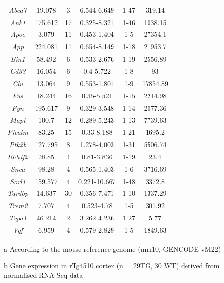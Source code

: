 \begin{table}[]
\begin{threeparttable}
\begin{tabular}{@{}cccccc@{}}
		\textit{Abca7}  & 19.078  & 3  & 6.544-6.649  & 1-47 & 319.14   \\
		\textit{Ank1}   & 175.612 & 17 & 0.325-8.321  & 1-46 & 1038.15  \\
		\textit{Apoe}   & 3.079   & 11 & 0.453-1.404  & 1-5  & 27354.1  \\
		\textit{App}    & 224.081 & 11 & 0.654-8.149  & 1-18 & 21953.7  \\
		\textit{Bin1}   & 58.492  & 6  & 0.533-2.676  & 1-19 & 2556.89  \\
		\textit{Cd33}   & 16.054  & 6  & 0.4-5.722    & 1-8  & 93       \\
		\textit{Clu}    & 13.064  & 9  & 0.553-1.801  & 1-9  & 17854.89 \\
		\textit{Fus}    & 18.244  & 16 & 0.35-5.521   & 1-15 & 2214.98  \\
		\textit{Fyn}    & 195.617 & 9  & 0.329-3.548  & 1-14 & 2077.36  \\
		\textit{Mapt}   & 100.7   & 12 & 0.289-5.243  & 1-13 & 7739.63  \\
		\textit{Picalm} & 83.25   & 15 & 0.33-8.188   & 1-21 & 1695.2   \\
		\textit{Ptk2b}  & 127.795 & 8  & 1.278-4.003  & 1-31 & 5506.74  \\
		\textit{Rhbdf2} & 28.85   & 4  & 0.81-3.836   & 1-19 & 23.4     \\
		\textit{Snca}   & 98.28   & 4  & 0.565-1.403  & 1-6  & 3716.69  \\
		\textit{Sorl1}  & 159.577 & 4  & 0.221-10.667 & 1-48 & 3372.8   \\
		\textit{Tardbp} & 14.637  & 30 & 0.356-7.471  & 1-10 & 1337.29  \\
		\textit{Trem2}  & 7.707   & 4  & 0.523-4.78   & 1-5  & 301.92   \\
		\textit{Trpa1}  & 46.214  & 2  & 3.262-4.236  & 1-27 & 5.77     \\
		\textit{Vgf}    & 6.959   & 4  & 0.579-2.829  & 1-5  & 1849.63  \\ \bottomrule
	\end{tabular}
		\begin{tablenotes}
	\footnotesize
	\item[a] According to the mouse reference genome (mm10, GENCODE vM22)
	\item[b] Gene expression in rTg4510 cortex (n = 29TG, 30 WT) derived from normalised RNA-Seq data\cite{Castanho2020}
\end{tablenotes}
\end{threeparttable}
\end{table}


